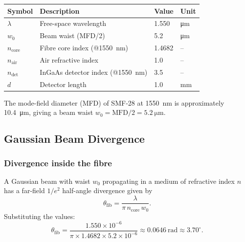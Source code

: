 \begin{center}
\begin{tabular}{@{}llll@{}}
\toprule
\textbf{Symbol} & \textbf{Description} & \textbf{Value} & \textbf{Unit} \\
\midrule
$\lambda$       & Free-space wavelength        & 1.550  & \si{\micro\metre} \\
$w_0$           & Beam waist (MFD/2)           & 5.2    & \si{\micro\metre} \\
$n_\text{core}$ & Fibre core index (@\SI{1550}{\nano\metre}) & 1.4682 & -- \\
$n_\text{air}$  & Air refractive index         & 1.0    & -- \\
$n_\text{det}$  & InGaAs detector index (@\SI{1550}{\nano\metre}) & 3.5 & -- \\
$d$             & Detector length              & 1.0    & \si{\milli\metre} \\
\bottomrule
\end{tabular}
\end{center}

\noindent
The mode-field diameter (MFD) of SMF-28 at \SI{1550}{\nano\metre} is
approximately \SI{10.4}{\micro\metre}, giving a beam waist
$w_0 = \text{MFD}/2 = \SI{5.2}{\micro\metre}$.

\subsection{Gaussian Beam Divergence}

\subsubsection{Divergence inside the fibre}

A Gaussian beam with waist $w_0$ propagating in a medium of refractive
index $n$ has a far-field $1/e^2$ half-angle divergence given by
%
\begin{equation}\label{eq:theta-fib}
  \theta_\text{fib}
  = \frac{\lambda}{\pi\, n_\text{core}\, w_0}.
\end{equation}
%
Substituting the values:
%
\begin{equation}
  \theta_\text{fib}
  = \frac{1.550 \times 10^{-6}}
         {\pi \times 1.4682 \times 5.2 \times 10^{-6}}
  \approx 0.0646~\text{rad}
  \approx 3.70^\circ.
\end{equation}

